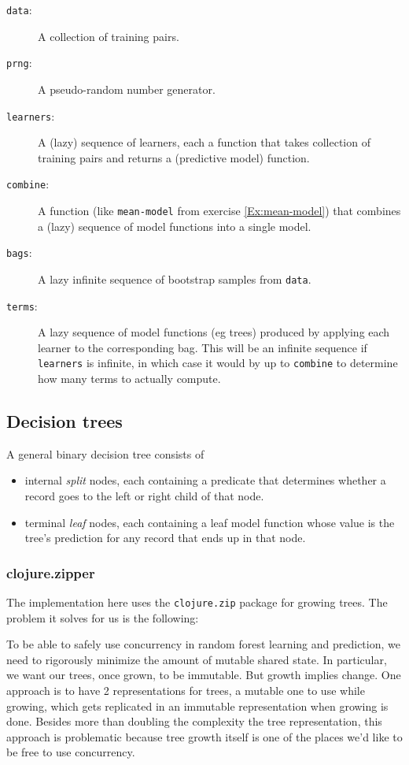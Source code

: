 \documentclass[11pt,openany,american,usenames,dvipsnames,svgnames,x11names,table,isodate]{article}
\numberwithin{equation}{section}
\numberwithin{figure}{section}
\begin{document}
\begin{description}
\item [{\texttt{data}:}] A collection of training pairs.
\item [{\texttt{prng}:}] A pseudo-random number generator.
\item [{\texttt{learners}:}] A (lazy) sequence of learners, each a function
that takes collection of training pairs and returns a (predictive
model) function.
\item [{\texttt{combine}:}] A function (like \texttt{mean-model} from exercise
\ref{Ex:mean-model}) that combines a (lazy) sequence of model functions
into a single model.
\item [{\texttt{bags}:}] A lazy infinite sequence of bootstrap samples
from \texttt{data}.
\item [{\texttt{terms}:}] A lazy sequence of model functions (eg trees)
produced by applying each learner to the corresponding bag. This will
be an infinite sequence if \texttt{learners} is infinite, in which
case it would by up to \texttt{combine} to determine how many terms
to actually compute. \end{description}

\subsection{\label{sub:Decision-trees}Decision trees}

A general binary decision tree consists of 
\begin{itemize}
\item internal \emph{split} nodes, each containing a predicate that determines
whether a record goes to the left or right child of that node.
\item terminal \emph{leaf} nodes, each containing a leaf model function
whose value is the tree's prediction for any record that ends up in
that node. 
\end{itemize}

\subsubsection{clojure.zipper}

The implementation here uses the \texttt{clojure.zip} package for
growing trees. The problem it solves for us is the following: 

To be able to safely use concurrency in random forest learning and
prediction, we need to rigorously minimize the amount of mutable shared
state. In particular, we want our trees, once grown, to be immutable.
But growth implies change. One approach is to have 2 representations
for trees, a mutable one to use while growing, which gets replicated
in an immutable representation when growing is done. Besides more
than doubling the complexity the tree representation, this approach
is problematic because tree growth itself is one of the places we'd
like to be free to use concurrency. 
\end{document}
